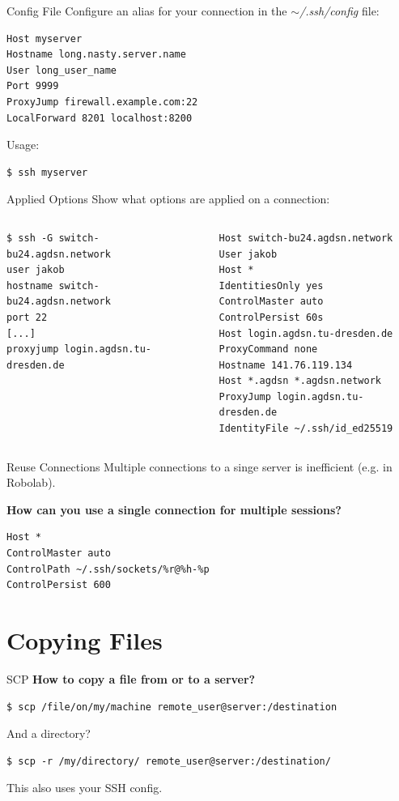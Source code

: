 \documentclass[10pt, graphics, aspectratio=169, table]{beamer}
\begin{document}
\begin{frame}[fragile]{Config File}
	Configure an alias for your connection in the \textit{$\sim$/.ssh/config} file:
	\begin{lstlisting}
Host myserver
Hostname long.nasty.server.name
User long_user_name
Port 9999
ProxyJump firewall.example.com:22
LocalForward 8201 localhost:8200
	\end{lstlisting}

	Usage:
	\begin{lstlisting}
$ ssh myserver
	\end{lstlisting}
\end{frame}

\begin{frame}[fragile]{Applied Options}
	Show what options are applied on a connection:
	\begin{columns}
		\begin{lstlisting}
$ ssh -G switch-bu24.agdsn.network
user jakob
hostname switch-bu24.agdsn.network
port 22
[...]
proxyjump login.agdsn.tu-dresden.de
		\end{lstlisting}
		\begin{lstlisting}
Host switch-bu24.agdsn.network
User jakob
Host *
IdentitiesOnly yes
ControlMaster auto
ControlPersist 60s
Host login.agdsn.tu-dresden.de
ProxyCommand none
Hostname 141.76.119.134
Host *.agdsn *.agdsn.network
ProxyJump login.agdsn.tu-dresden.de
IdentityFile ~/.ssh/id_ed25519
		\end{lstlisting}
    \end{columns}
\end{frame}

\begin{frame}[fragile]{Reuse Connections}
	Multiple connections to a singe server is inefficient (e.g. in Robolab).
	\pause

	\textbf{How can you use a single connection for multiple sessions?}
	\begin{lstlisting}
Host *
ControlMaster auto
ControlPath ~/.ssh/sockets/%r@%h-%p
ControlPersist 600
	\end{lstlisting}
\end{frame}

\section{Copying Files}
\begin{frame}[fragile]{SCP}
	\textbf{How to copy a file from or to a server?}
	\pause

	\begin{lstlisting}
$ scp /file/on/my/machine remote_user@server:/destination
	\end{lstlisting}
	\pause

	And a directory?
	\begin{lstlisting}
$ scp -r /my/directory/ remote_user@server:/destination/
	\end{lstlisting}
	This also uses your SSH config.
\end{frame}
\end{document}
